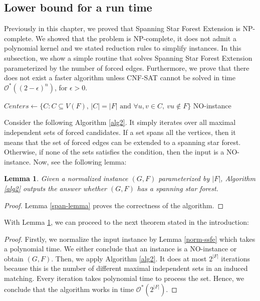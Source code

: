 \documentclass[en]{pracamgr}
\newtheorem{lemma}{Lemma}
\theoremstyle{definition}
\newcommand{\ssf}{spanning star forest}
\newcommand{\ssfep}{{\sc Spanning Star Forest Extension}}
\newcommand{\cnfsat}{{\sc CNF-SAT}}
\begin{document}
\subsection{Lower bound for a run time}

Previously in this chapter, we proved that \ssfep{} is NP-complete. We showed that the problem is NP-complete, it does not admit a polynomial kernel and we stated reduction rules to simplify instances. In this subsection, we show a simple routine that solves \ssfep{} parameterized by the number of forced edges. Furthermore, we prove that there does not exist a faster algorithm unless \cnfsat{} cannot be solved in time $\mathcal{O}^*((2-\epsilon)^n)$, for $\epsilon>0$.

\begin{algorithm}\label{alg2}
	\KwResult{\ssf{} of $G$ extending $F$}
	$Centers \leftarrow \{C: C \subseteq V(F) \text{, }|C|=|F| \text{ and } \forall u,v \in C,\ vu \notin F\}$\;
	\Return NO-instance\;
	\caption{Extending a spanning star forest from a normalized graph.}
\end{algorithm}

Consider the following Algorithm \ref{alg2}. It simply iterates over all maximal independent sets of forced candidates. If a set spans all the vertices, then it means that the set of forced edges can be extended to a spanning star forest. Otherwise, if none of the sets satisfies the condition, then the input is a NO-instance. Now, see the following lemma:

\begin{lemma}\label{alg2-correctness}
	Given a normalized instance $(G,F)$ parameterized by $|F|$, Algorithm \ref{alg2} outputs the answer whether $(G,F)$ has a spanning star forest.
\end{lemma}

\begin{proof}
	Lemma \ref{span-lemma} proves the correctness of the algorithm.
\end{proof}

With Lemma \ref{alg2-correctness}, we can proceed to the next theorem stated in the introduction:

\thmssfepfetime*

\begin{proof}
	Firstly, we normalize the input instance by Lemma \ref{norm-ssfe} which takes a polynomial time. We either conclude that an instance is a NO-instance or obtain $(G,F)$. Then, we apply Algorithm \ref{alg2}. It does at most $2^{|F|}$ iterations because this is the number of different maximal independent sets in an induced matching. Every iteration takes polynomial time to process the set. Hence, we conclude that the algorithm works in time $\mathcal{O}^*(2^{|F|})$.
\end{proof}
\end{document}
